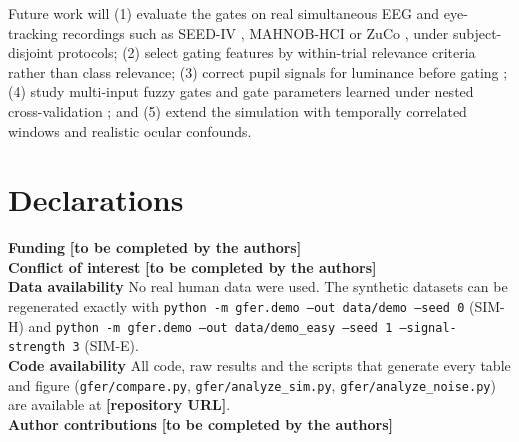 \documentclass[11pt,a4paper]{article}
\newcommand{\pending}[1]{\textcolor{red!75!black}{\textbf{[#1]}}}
\begin{document}
Future work will (1) evaluate the gates on real simultaneous EEG and eye-tracking recordings such as SEED-IV \cite{Zheng2019}, MAHNOB-HCI \cite{Soleymani2012db} or ZuCo \cite{Hollenstein2018}, under subject-disjoint protocols; (2) select gating features by within-trial relevance criteria rather than class relevance; (3) correct pupil signals for luminance before gating \cite{Raiturkar2016}; (4) study multi-input fuzzy gates and gate parameters learned under nested cross-validation \cite{Jang1993}; and (5) extend the simulation with temporally correlated windows and realistic ocular confounds.

\section*{Declarations}
\noindent\textbf{Funding} \pending{to be completed by the authors}\\
\textbf{Conflict of interest} \pending{to be completed by the authors}\\
\textbf{Data availability} No real human data were used. The synthetic datasets can be regenerated exactly with \texttt{python -m gfer.demo --out data/demo --seed 0} (SIM-H) and \texttt{python -m gfer.demo --out data/demo\_easy --seed 1 --signal-strength 3} (SIM-E).\\
\textbf{Code availability} All code, raw results and the scripts that generate every table and figure (\texttt{gfer/compare.py}, \texttt{gfer/analyze\_sim.py}, \texttt{gfer/analyze\_noise.py}) are available at \pending{repository URL}.\\
\textbf{Author contributions} \pending{to be completed by the authors}
\end{document}
